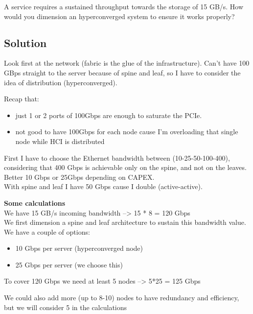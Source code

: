 A service requires a sustained throughput towards the storage of 15
GB/s. How would you dimension an hyperconverged system to ensure it
works properly?

\hypertarget{solution-4}{%
\subsection{Solution}\label{solution-4}}

Look first at the network (fabric is the glue of the infrastructure).
Can't have 100 GBps straight to the server because of spine and leaf, so
I have to consider the idea of distribution (hyperconverged).

{\ns Recap that:
\begin{itemize}
\item
  just 1 or 2 ports of 100Gbps are enough to saturate the PCIe.
\item
  not good to have 100Gbps for each node cause I'm overloading that
  single node while HCI is distributed
\end{itemize}}

First I have to choose the Ethernet bandwidth between
(10-25-50-100-400), considering that 400 Gbps is achievable only on the
spine, and not on the leaves.\\
Better 10 Gbps or 25Gbps depending on CAPEX.\\
With spine and leaf I have 50 Gbps cause I double (active-active).

\textbf{Some calculations}\\
We have 15 GB/s incoming bandwidth --\textgreater{} 15 * 8 = 120 Gbps\\
We first dimension a spine and leaf architecture to sustain this
bandwidth value.\\
We have a couple of options:

\begin{itemize}
\item
  10 Gbps per server (hyperconverged node)
\item
  25 Gbps per server (we choose this)
\end{itemize}

To cover 120 Gbps we need at least 5 nodes --\textgreater{} 5*25 = 125
Gbps

We could also add more (up to 8-10) nodes to have redundancy and
efficiency, but we will consider 5 in the calculations

